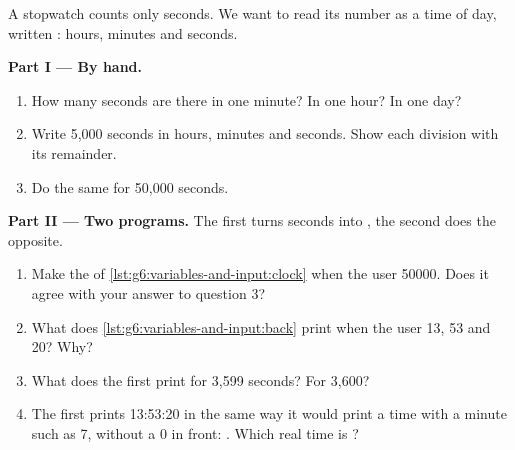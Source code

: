 \begin{problem}\label{pb:g6:variables-and-input:1}
A stopwatch counts only seconds. We want to read its number as a time of day,
written : hours, minutes and seconds.

\medskip\noindent\textbf{Part I --- By hand.}
\begin{enumerate}
  \item How many seconds are there in one minute? In one hour? In one day?
  \item Write 5,000 seconds in hours, minutes and seconds. Show each division
    with its remainder.
  \item Do the same for 50,000 seconds.
\end{enumerate}

\medskip\noindent\textbf{Part II --- Two programs.} The first  turns
seconds into , the second does the opposite.

\label{lst:g6:variables-and-input:clock}

\label{lst:g6:variables-and-input:back}

\begin{enumerate}[resume]
  \item Make the  of \cref{lst:g6:variables-and-input:clock} when
    the user  50000. Does it agree with your answer to question 3?
  \item What does \cref{lst:g6:variables-and-input:back} print when the user
     13, 53 and 20? Why?
  \item What does the first  print for 3,599 seconds? For 3,600?
  \item The first  prints 13:53:20 in the same way it would print a
    time with a minute such as 7, without a 0 in front: . Which
    real time is ?
\end{enumerate}


\end{problem}
